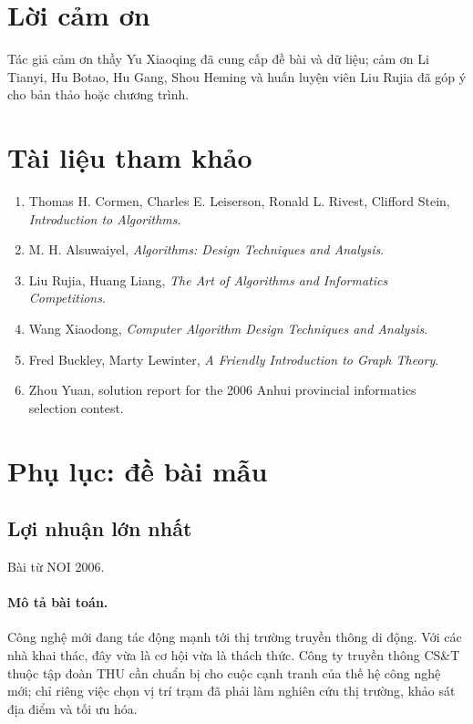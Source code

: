 \documentclass[11pt]{article}
\begin{document}
\section*{Lời cảm ơn}

Tác giả cảm ơn thầy Yu Xiaoqing đã cung cấp đề bài và dữ liệu; cảm ơn Li
Tianyi, Hu Botao, Hu Gang, Shou Heming và huấn luyện viên Liu Rujia đã góp ý
cho bản thảo hoặc chương trình.

\section*{Tài liệu tham khảo}

\begin{enumerate}
  \item Thomas H. Cormen, Charles E. Leiserson, Ronald L. Rivest, Clifford
  Stein, \emph{Introduction to Algorithms}.
  \item M. H. Alsuwaiyel, \emph{Algorithms: Design Techniques and Analysis}.
  \item Liu Rujia, Huang Liang, \emph{The Art of Algorithms and Informatics
  Competitions}.
  \item Wang Xiaodong, \emph{Computer Algorithm Design Techniques and
  Analysis}.
  \item Fred Buckley, Marty Lewinter, \emph{A Friendly Introduction to Graph
  Theory}.
  \item Zhou Yuan, solution report for the 2006 Anhui provincial informatics
  selection contest.
\end{enumerate}

\section*{Phụ lục: đề bài mẫu}

\subsection*{Lợi nhuận lớn nhất}

Bài từ NOI 2006.

\paragraph{Mô tả bài toán.}
Công nghệ mới đang tác động mạnh tới thị trường truyền thông di động. Với các
nhà khai thác, đây vừa là cơ hội vừa là thách thức. Công ty truyền thông
CS\&T thuộc tập đoàn THU cần chuẩn bị cho cuộc cạnh tranh của thế hệ công nghệ
mới; chỉ riêng việc chọn vị trí trạm đã phải làm nghiên cứu thị trường, khảo
sát địa điểm và tối ưu hóa.
\end{document}
